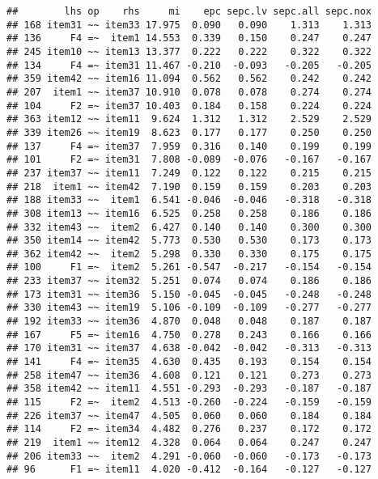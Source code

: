 \documentclass[
  english,
  man]{apa6}
\begin{document}
\begin{verbatim}
##        lhs op    rhs     mi    epc sepc.lv sepc.all sepc.nox
## 168 item31 ~~ item33 17.975  0.090   0.090    1.313    1.313
## 136     F4 =~  item1 14.553  0.339   0.150    0.247    0.247
## 245 item10 ~~ item13 13.377  0.222   0.222    0.322    0.322
## 134     F4 =~ item31 11.467 -0.210  -0.093   -0.205   -0.205
## 359 item42 ~~ item16 11.094  0.562   0.562    0.242    0.242
## 207  item1 ~~ item37 10.910  0.078   0.078    0.274    0.274
## 104     F2 =~ item37 10.403  0.184   0.158    0.224    0.224
## 363 item12 ~~ item11  9.624  1.312   1.312    2.529    2.529
## 339 item26 ~~ item19  8.623  0.177   0.177    0.250    0.250
## 137     F4 =~ item37  7.959  0.316   0.140    0.199    0.199
## 101     F2 =~ item31  7.808 -0.089  -0.076   -0.167   -0.167
## 237 item37 ~~ item11  7.249  0.122   0.122    0.215    0.215
## 218  item1 ~~ item42  7.190  0.159   0.159    0.203    0.203
## 188 item33 ~~  item1  6.541 -0.046  -0.046   -0.318   -0.318
## 308 item13 ~~ item16  6.525  0.258   0.258    0.186    0.186
## 332 item43 ~~  item2  6.427  0.140   0.140    0.300    0.300
## 350 item14 ~~ item42  5.773  0.530   0.530    0.173    0.173
## 362 item42 ~~  item2  5.298  0.330   0.330    0.175    0.175
## 100     F1 =~  item2  5.261 -0.547  -0.217   -0.154   -0.154
## 233 item37 ~~ item32  5.251  0.074   0.074    0.186    0.186
## 173 item31 ~~ item36  5.150 -0.045  -0.045   -0.248   -0.248
## 330 item43 ~~ item19  5.106 -0.109  -0.109   -0.277   -0.277
## 192 item33 ~~ item36  4.870  0.048   0.048    0.187    0.187
## 167     F5 =~ item16  4.750  0.278   0.243    0.166    0.166
## 170 item31 ~~ item37  4.638 -0.042  -0.042   -0.313   -0.313
## 141     F4 =~ item35  4.630  0.435   0.193    0.154    0.154
## 258 item47 ~~ item36  4.608  0.121   0.121    0.273    0.273
## 358 item42 ~~ item11  4.551 -0.293  -0.293   -0.187   -0.187
## 115     F2 =~  item2  4.513 -0.260  -0.224   -0.159   -0.159
## 226 item37 ~~ item47  4.505  0.060   0.060    0.184    0.184
## 114     F2 =~ item34  4.482  0.276   0.237    0.172    0.172
## 219  item1 ~~ item12  4.328  0.064   0.064    0.247    0.247
## 206 item33 ~~  item2  4.291 -0.060  -0.060   -0.173   -0.173
## 96      F1 =~ item11  4.020 -0.412  -0.164   -0.127   -0.127
\end{verbatim}
\end{document}
